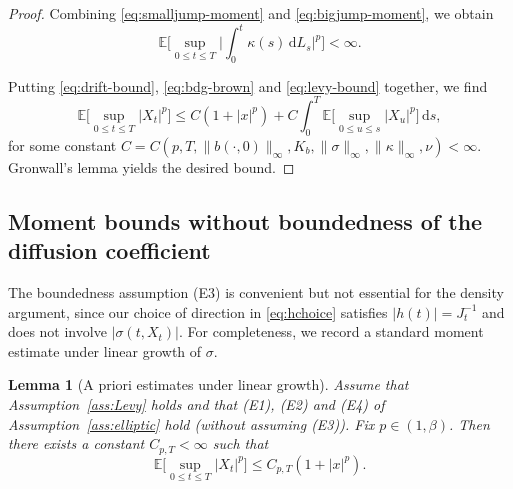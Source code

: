 \documentclass[11pt]{article}
\newcommand{\E}{\mathbb{E}}
\newcommand{\1}{\mathbf{1}}
\newcommand{\dd}{\mathrm{d}}
\theoremstyle{plain}
\newtheorem{lemma}[theorem]{Lemma}
\theoremstyle{definition}
\theoremstyle{remark}
\begin{document}
\begin{proof}
\smallskip
\noindent Combining \eqref{eq:smalljump-moment} and \eqref{eq:bigjump-moment}, we obtain
\begin{equation}\label{eq:levy-bound}
\E\Big[\sup_{0\le t\le T}\Big|\int_0^t \kappa(s)\,\dd L_s\Big|^p\Big]<\infty.
\end{equation}

\medskip
Putting \eqref{eq:drift-bound}, \eqref{eq:bdg-brown} and \eqref{eq:levy-bound} together, we find
\[
\E\Big[\sup_{0\le t\le T}|X_t|^p\Big]
\le C(1+|x|^p)+C\int_0^T \E\Big[\sup_{0\le u\le s}|X_u|^p\Big]\,\dd s,
\]
for some constant $C=C(p,T,\|b(\cdot,0)\|_\infty,K_b,\|\sigma\|_\infty,\|\kappa\|_\infty,\nu)<\infty$.
Gronwall's lemma yields the desired bound.
\end{proof}



\subsection{Moment bounds without boundedness of the diffusion coefficient}


The boundedness assumption (E3) is convenient but not essential for the density argument, since our choice of
direction in \eqref{eq:hchoice} satisfies $|h(t)|=J_t^{-1}$ and does not involve $|\sigma(t,X_t)|$.
For completeness, we record a standard moment estimate under linear growth of $\sigma$.

\begin{lemma}[A priori estimates under linear growth]\label{lem:apriori-linear}
Assume that Assumption~\ref{ass:Levy} holds and that (E1), (E2) and (E4) of Assumption~\ref{ass:elliptic} hold
(without assuming (E3)).
Fix $p\in(1,\beta)$.
Then there exists a constant $C_{p,T}<\infty$ such that
\[
\E\Big[\sup_{0\le t\le T}|X_t|^p\Big]\le C_{p,T}(1+|x|^p).
\]
\end{lemma}
\end{document}
